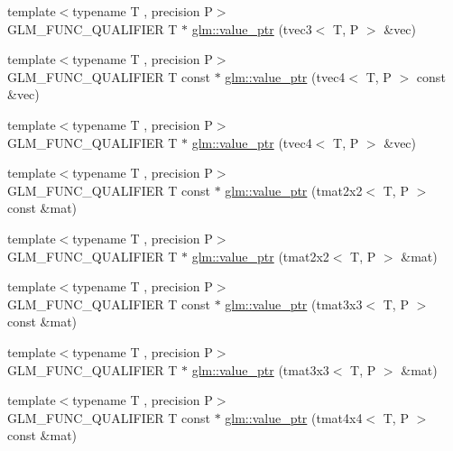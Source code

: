 \begin{DoxyCompactItemize}
{\footnotesize template$<$typename T , precision P$>$ }\\G\-L\-M\-\_\-\-F\-U\-N\-C\-\_\-\-Q\-U\-A\-L\-I\-F\-I\-E\-R T $\ast$ \hyperlink{group__gtc__type__ptr_gab2832ef9f1d2571fab5c7ae661e11e75}{glm\-::value\-\_\-ptr} (tvec3$<$ T, P $>$ \&vec)
\item 
{\footnotesize template$<$typename T , precision P$>$ }\\G\-L\-M\-\_\-\-F\-U\-N\-C\-\_\-\-Q\-U\-A\-L\-I\-F\-I\-E\-R T const $\ast$ \hyperlink{group__gtc__type__ptr_gaf641bc0e28d4b274826b9afed315d310}{glm\-::value\-\_\-ptr} (tvec4$<$ T, P $>$ const \&vec)
\item 
{\footnotesize template$<$typename T , precision P$>$ }\\G\-L\-M\-\_\-\-F\-U\-N\-C\-\_\-\-Q\-U\-A\-L\-I\-F\-I\-E\-R T $\ast$ \hyperlink{group__gtc__type__ptr_ga4c19763f3c5991b9dc88a3ffdd9ea6cd}{glm\-::value\-\_\-ptr} (tvec4$<$ T, P $>$ \&vec)
\item 
{\footnotesize template$<$typename T , precision P$>$ }\\G\-L\-M\-\_\-\-F\-U\-N\-C\-\_\-\-Q\-U\-A\-L\-I\-F\-I\-E\-R T const $\ast$ \hyperlink{group__gtc__type__ptr_ga2d709523aa0beb0a42433f80c9d07718}{glm\-::value\-\_\-ptr} (tmat2x2$<$ T, P $>$ const \&mat)
\item 
{\footnotesize template$<$typename T , precision P$>$ }\\G\-L\-M\-\_\-\-F\-U\-N\-C\-\_\-\-Q\-U\-A\-L\-I\-F\-I\-E\-R T $\ast$ \hyperlink{group__gtc__type__ptr_gac7256e14328e818e61276fa5e6176b9d}{glm\-::value\-\_\-ptr} (tmat2x2$<$ T, P $>$ \&mat)
\item 
{\footnotesize template$<$typename T , precision P$>$ }\\G\-L\-M\-\_\-\-F\-U\-N\-C\-\_\-\-Q\-U\-A\-L\-I\-F\-I\-E\-R T const $\ast$ \hyperlink{group__gtc__type__ptr_ga0fd20ac385befba86cf2bbf836728bc2}{glm\-::value\-\_\-ptr} (tmat3x3$<$ T, P $>$ const \&mat)
\item 
{\footnotesize template$<$typename T , precision P$>$ }\\G\-L\-M\-\_\-\-F\-U\-N\-C\-\_\-\-Q\-U\-A\-L\-I\-F\-I\-E\-R T $\ast$ \hyperlink{group__gtc__type__ptr_ga4470e16d0e844cb2c4f7b2e731824f87}{glm\-::value\-\_\-ptr} (tmat3x3$<$ T, P $>$ \&mat)
\item 
{\footnotesize template$<$typename T , precision P$>$ }\\G\-L\-M\-\_\-\-F\-U\-N\-C\-\_\-\-Q\-U\-A\-L\-I\-F\-I\-E\-R T const $\ast$ \hyperlink{group__gtc__type__ptr_ga2edadf5433694bf018d62db962b61321}{glm\-::value\-\_\-ptr} (tmat4x4$<$ T, P $>$ const \&mat)

\end{DoxyCompactItemize}

